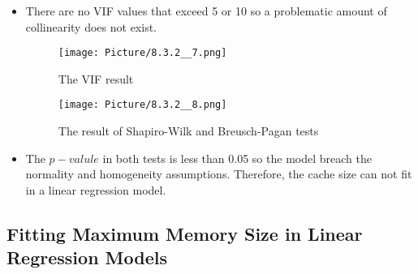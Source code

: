 \documentclass[a4paper]{article}
\begin{document}
\begin{itemize}
    \item[]There are no VIF values that exceed 5 or 10 so a problematic amount of collinearity does not exist.
    
    \begin{figure}[H]
        \centering
        \texttt{[image: Picture/8.3.2\_\_7.png]}
        \caption{The VIF result}
        \label{8.3.5.5}
    \end{figure}
    
     \begin{figure}[H]
        \centering
        \texttt{[image: Picture/8.3.2\_\_8.png]}
        \caption{The result of Shapiro-Wilk and Breusch-Pagan tests}
        \label{8.3.4}
    \end{figure}
     
      \item[] The $p-valule$ in both tests is less than 0.05 so the model breach the normality and homogeneity assumptions. Therefore, the cache size can not fit in a linear regression model.
     
\end{itemize}    

\subsection{Fitting Maximum Memory Size in Linear Regression Models}
\end{document}
